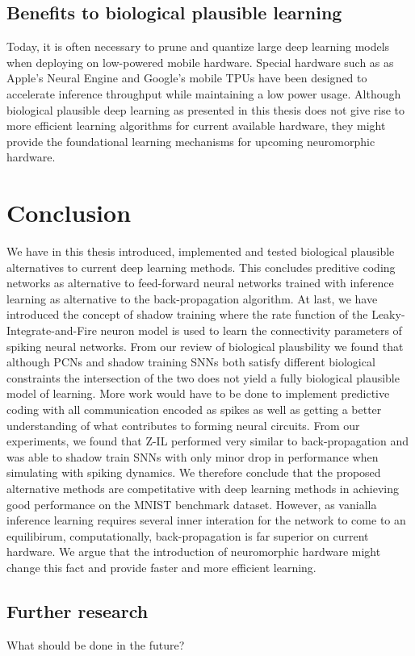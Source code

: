 \documentclass[a4paper,11pt]{article} %
\begin{document}
\subsection{Benefits to biological plausible learning}

Today, it is often necessary to prune and quantize large deep learning models when deploying on low-powered mobile hardware. Special hardware such as as Apple's Neural Engine and Google's mobile TPUs have been designed to accelerate inference throughput while maintaining a low power usage. Although biological plausible deep learning as presented in this thesis does not give rise to more efficient learning algorithms for current available hardware, they might provide the foundational learning mechanisms for upcoming neuromorphic hardware. 

\newpage

\section{Conclusion}
We have in this thesis introduced, implemented and tested biological plausible alternatives to current deep learning methods. This concludes preditive coding networks as alternative to feed-forward neural networks trained with inference learning as alternative to the back-propagation algorithm. At last, we have introduced the concept of shadow training where the rate function of the Leaky-Integrate-and-Fire neuron model is used to learn the connectivity parameters of spiking neural networks. From our review of biological plausbility we found that although PCNs and shadow training SNNs both satisfy different biological constraints the intersection of the two does not yield a fully biological plausible model of learning. More work would have to be done to implement predictive coding with all communication encoded as spikes as well as getting a better understanding of what contributes to forming neural circuits. From our experiments, we found that Z-IL performed very similar to back-propagation and was able to shadow train SNNs with only minor drop in performance when simulating with spiking dynamics. We therefore conclude that the proposed alternative methods are competitative with deep learning methods in achieving good performance on the MNIST benchmark dataset. However, as vanialla inference learning requires several inner interation for the network to come to an equilibirum, computationally, back-propagation is far superior on current hardware. We argue that the introduction of neuromorphic hardware might change this fact and provide faster and more efficient learning. 

\subsection{Further research}
What should be done in the future?

\newpage


\end{document}
